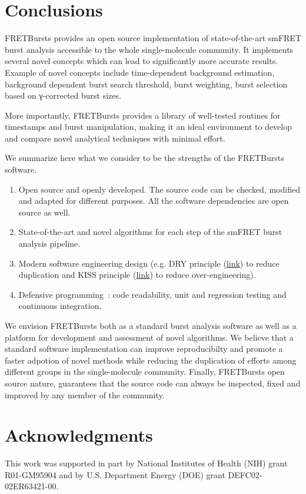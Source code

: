 \section{Conclusions}
\label{sec:conclusions}

FRETBursts provides an open source implementation of state-of-the-art smFRET burst analysis 
accessible to the whole single-molecule community.
It implements several novel concepts which can lead 
to significantly more accurate results. Example of novel concepts include
time-dependent background estimation, background dependent burst search threshold,
burst weighting, burst selection based on γ-corrected burst sizes.

More importantly, FRETBursts provides a library of well-tested routines
for timestamps and burst manipulation, making it an ideal environment to 
develop and compare novel analytical techniques with minimal effort.

We summarize here what we consider to be the strengths
of the FRETBursts software.

\begin{enumerate}
\item Open source and openly developed. The source code can be checked, modified and
adapted for different purposes. All the software dependencies are open source as well.
\item State-of-the-art and novel algorithms for each step of the
smFRET burst analysis pipeline.
\item Modern software engineering design (e.g. DRY principle
(\href{http://en.wikipedia.org/wiki/Don\%27t_repeat_yourself}{link})
to reduce duplication and KISS principle
(\href{http://en.wikipedia.org/wiki/KISS_principle}{link})
to reduce over-engineering).
\item Defensive programming~\cite{Prli__2012}: code readability,
unit and regression testing and continuous integration.
\end{enumerate}

We envision FRETBursts both as a standard burst analysis 
software as well as a platform for development and assessment of novel algorithms.
We believe that a standard software implementation can improve 
reproducibilty and promote a faster adpotion of novel methods 
while reducing the duplication of efforts among different groups 
in the single-molecule community.
Finally, FRETBursts open source nature, guarantees that the source code 
can always be inspected, fixed and improved 
by any member of the community.


\section*{Acknowledgments}
This work was supported in part by National Institutes of Health (NIH)
grant R01-GM95904 and by U.S. Department Energy (DOE) grant DEFC02-02ER63421-00.
